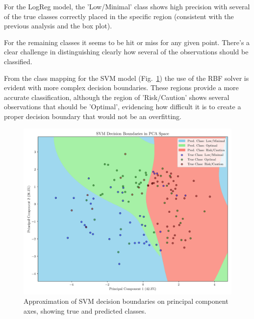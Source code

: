\documentclass[conference]{IEEEtran}
\begin{document}
For the LogReg model, the 'Low/Minimal' class shows high precision with several of the true classes correctly placed in the specific region (consistent with the previous analysis and the box plot).

For the remaining classes it seems to be hit or miss for any given point. There's a clear challenge in distinguishing clearly how several of the observations should be classified. 

From the class mapping for the SVM model (Fig.~\ref{pca_svm}) the use of the RBF solver is evident with more complex decision boundaries. These regions provide a more accurate classification, although the region of 'Risk/Caution' shows several observations that should be 'Optimal', evidencing how difficult it is to create a proper decision boundary that would not be an overfitting.

\begin{figure}[H]
    \centering
    \includegraphics[width=1\linewidth]{assets/pca_svm.png}
    \caption{Approximation of SVM decision boundaries on principal component axes, showing true and predicted classes.}
    \label{pca_svm}
\end{figure} %
\end{document}
